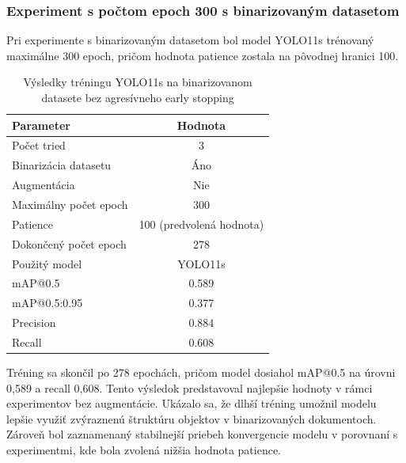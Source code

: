                \subsubsection{Experiment s počtom epoch 300 s binarizovaným datasetom}

                Pri experimente s binarizovaným datasetom bol model YOLO11s trénovaný maximálne 300 epoch, pričom hodnota patience zostala na pôvodnej hranici 100.

                \begin{table}[H]
                    \centering
                    \begin{tabular}{|l|c|}
                    \hline
                    \textbf{Parameter} & \textbf{Hodnota} \\ \hline
                    Počet tried & 3 \\ \hline
                    Binarizácia datasetu & Áno \\ \hline
                    Augmentácia & Nie \\ \hline
                    Maximálny počet epoch & 300 \\ \hline
                    Patience & 100 (predvolená hodnota) \\ \hline
                    Dokončený počet epoch & 278 \\ \hline
                    Použitý model & YOLO11s \\ \hline
                    mAP@0.5 & 0.589 \\ \hline
                    mAP@0.5:0.95 & 0.377 \\ \hline
                    Precision & 0.884 \\ \hline
                    Recall & 0.608 \\ \hline
                    \end{tabular}
                    \caption{Výsledky tréningu YOLO11s na binarizovanom datasete bez agresívneho early stopping}
                    \label{tab:yolo11s_binary_300}
                \end{table}

                Tréning sa skončil po 278 epochách, pričom model dosiahol mAP@0.5 na úrovni 0,589 a recall 0,608. Tento výsledok predstavoval najlepšie hodnoty v rámci experimentov bez augmentácie. Ukázalo sa, že dlhší tréning umožnil modelu lepšie využiť zvýraznenú štruktúru objektov v binarizovaných dokumentoch. Zároveň bol zaznamenaný stabilnejší priebeh konvergencie modelu v porovnaní s experimentmi, kde bola zvolená nižšia hodnota patience.

